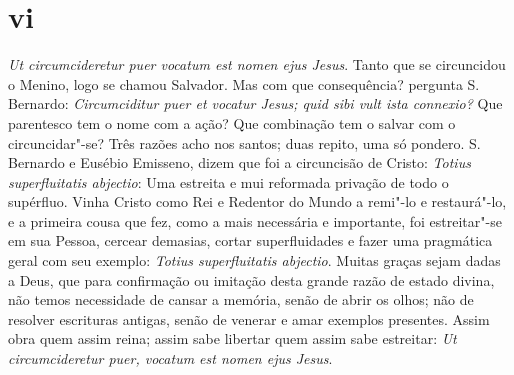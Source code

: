 \section{vi}

\emph{Ut circumcideretur puer vocatum est nomen ejus Jesus}. Tanto que
se circuncidou o Menino, logo se chamou Salvador. Mas com que
consequência? pergunta S.\,Bernardo: \emph{Circumciditur puer et
vocatur Jesus; quid sibi vult ista connexio?} Que parentesco tem o nome
com a ação? Que combinação tem o salvar com o circuncidar"-se? Três
razões acho nos santos; duas repito, uma só pondero. S.\,Bernardo e
Eusébio Emisseno, dizem que foi a circuncisão de Cristo: \emph{Totius
superfluitatis abjectio}: Uma estreita e mui reformada privação de todo
o supérfluo. Vinha Cristo como Rei e Redentor do Mundo a remi"-lo e
restaurá"-lo, e a primeira cousa que fez, como a mais necessária e
importante, foi estreitar"-se em sua Pessoa, cercear demasias, cortar
superfluidades e fazer uma pragmática geral com seu exemplo:
\emph{Totius superfluitatis abjectio}. Muitas graças sejam dadas a Deus,
que para confirmação ou imitação desta grande razão de estado divina,
não temos necessidade de cansar a memória, senão de abrir os olhos; não
de resolver escrituras antigas, senão de venerar e amar exemplos
presentes. Assim obra quem assim reina; assim sabe libertar quem assim
sabe estreitar: \emph{Ut circumcideretur puer, vocatum est nomen ejus
Jesus}.

